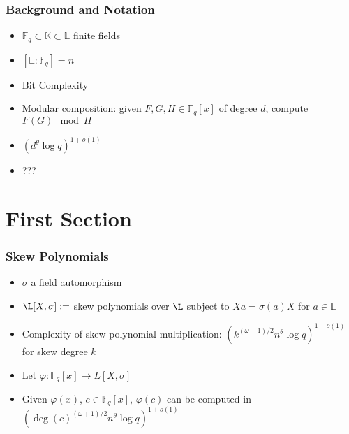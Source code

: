 \documentclass{beamer}
\newcommand{\F}{\mathbb{F}}
\begin{document}
\begin{frame}
\frametitle{Background and Notation}

\begin{itemize}

\item $\mathbb{F}_q \subset \mathbb{K} \subset \mathbb{L}$ finite fields
\item $[\mathbb{L} : \F_q] = n$
\item Bit Complexity
\item Modular composition: given $F,G,H \in \F_q[x]$ of degree $d$, compute $F(G) \mod H$

\item $(d^{\theta} \log q)^{1 + o(1)}$
\item ???

  
  
  
  
\end{itemize}

\end{frame}


\section{First Section} %



\begin{frame}
\frametitle{Skew Polynomials}
\begin{itemize}
\item $\sigma$ a field automorphism
\item $\L[X,\sigma] := $ skew polynomials over $\L$ subject to $Xa = \sigma(a)X$ for $a \in \mathbb{L}$ 

\item Complexity of skew polynomial multiplication: $(k^{(\omega +1)/2}n^{\theta} \log q)^{1 + o(1)}$ for skew degree $k$

\item Let $\varphi: \F_q[x] \to L[X,\sigma]$
\item Given $\varphi(x)$, $c \in \F_q[x]$, $\varphi(c)$ can be computed in $(\deg(c)^{(\omega + 1)/2}n^{\theta} \log q)^{1 + o(1)} $


\end{itemize}


\end{frame}
\end{document}
